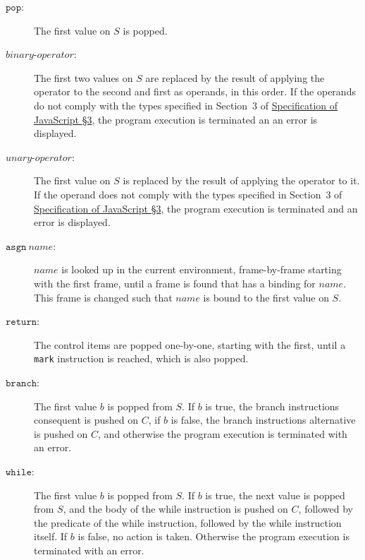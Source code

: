 \begin{description}

\item[$\texttt{pop}$:]
The first value on $S$ is popped.

\item[$\textit{binary-operator}$:]
The first two values on $S$ are replaced by the result of
applying the operator to the second and first as operands, in this order.
If the operands do not comply with the
types specified in Section~3 of
\href{https://docs.sourceacademy.org/javascript/javascript_3.pdf}{\color{blue}Specification of JavaScript \S 3},
the program execution is terminated an an error is displayed.

\item[$\textit{unary-operator}$:]
The first value on $S$ is replaced by the result of
applying the operator to it.
If the operand does not comply with the
types specified in Section~3 of
\href{https://docs.sourceacademy.org/javascript/javascript_3.pdf}{\color{blue}Specification of JavaScript \S 3},
the program execution is terminated and an error is displayed.

\item[$\texttt{asgn}\ \textit{name}$:]
$\textit{name}$ is looked up in the current environment, frame-by-frame starting with the
first frame, 
until a frame is found that has a binding for 
$\textit{name}$.
This frame is changed such that $\textit{name}$ is bound to the first value on $S$.

 
\item[$\texttt{return}$:]
The control items are popped one-by-one, starting with the first, until
a \texttt{mark} instruction is reached, which is also popped.

\item[$\texttt{branch}$:]
The first value $b$ is popped from $S$. If $b$ is true, the branch instructions
consequent is pushed on $C$, if $b$ is false,
the branch instructions
alternative is pushed on $C$, and otherwise the program
execution is terminated with an error.

\item[$\texttt{while}$:]
The first value $b$ is popped from $S$. If $b$ is true,
the next value is popped from $S$, and the body of the
while instruction is pushed on $C$, followed by the predicate
of the while instruction, followed by the while instruction itself.
If $b$ is false, no action is taken.
Otherwise the program
execution is terminated with an error.


\end{description}
